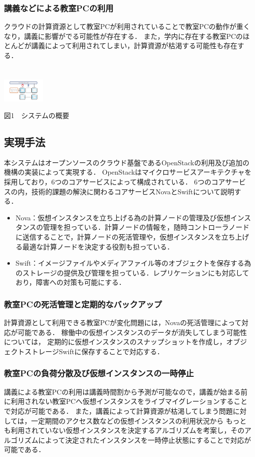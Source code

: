 \documentclass[11pt,a4paper]{jsarticle}
\begin{document}
\subsubsection{講義などによる教室PCの利用}
クラウドの計算資源として教室PCが利用されていることで教室PCの動作が重くなり，講義に影響がでる可能性が存在する．
また，学内に存在する教室PCのほとんどが講義によって利用されてしまい，計算資源が枯渇する可能性も存在する．
\\
\\
\\
\includegraphics[width=2.1cm, bb=0 0 300 400]{graph1.pdf}
\begin{center}図1　システムの概要\end{center}

\subsection{実現手法}
本システムはオープンソースのクラウド基盤であるOpenStack\cite{openstack}の利用及び追加の機構の実装によって実現する．
OpenStackはマイクロサービスアーキテクチャを採用しており，6つのコアサービスによって構成されている．
6つのコアサービスの内，技術的課題の解決に関わるコアサービスNovaとSwiftについて説明する．
\begin{itemize}
	\item Nova：仮想インスタンスを立ち上げる為の計算ノードの管理及び仮想インスタンスの管理を担っている．計算ノードの情報を，随時コントローラノードに送信することで，計算ノードの死活管理や，仮想インスタンスを立ち上げる最適な計算ノードを決定する役割も担っている．
	\item Swift：イメージファイルやメディアファイル等のオブジェクトを保存する為のストレージの提供及び管理を担っている．レプリケーションにも対応しており，障害への対策も可能にする．
\end{itemize}
\subsubsection{教室PCの死活管理と定期的なバックアップ}
計算資源として利用できる教室PCが変化問題には，Novaの死活管理によって対応が可能である．
稼働中の仮想インスタンスのデータが消失してしまう可能性については，
定期的に仮想インスタンスのスナップショットを作成し，オブジェクトストレージSwiftに保存することで対応する．
\subsubsection{教室PCの負荷分散及び仮想インスタンスの一時停止}
講義による教室PCの利用は講義時間割から予測が可能なので，講義が始まる前に利用されない教室PCへ仮想インスタンスをライブマイグレーションすることで対応が可能である．
また，講義によって計算資源が枯渇してしまう問題に対しては，一定期間のアクセス数などの仮想インスタンスの利用状況から
もっとも利用されていない仮想インスタンスを決定するアルゴリズムを考案し，そのアルゴリズムによって決定されたインスタンスを一時停止状態にすることで対応が可能である．
\end{document}
